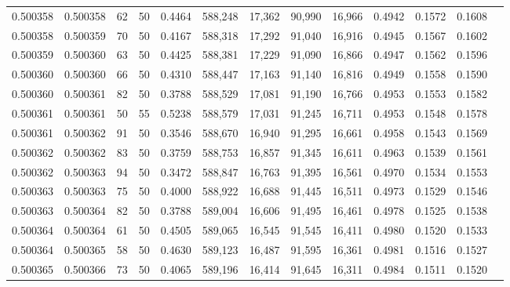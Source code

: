 \begin{tabular}{rrrrrrrrrrrrr}
0.500358 & 0.500358 &    62 &  50 &                                     0.4464 & 588,248 &  17,362 &  90,990 &  16,966 & 0.4942 & 0.1572 & 0.1608 \\
0.500358 & 0.500359 &    70 &  50 &                                     0.4167 & 588,318 &  17,292 &  91,040 &  16,916 & 0.4945 & 0.1567 & 0.1602 \\
0.500359 & 0.500360 &    63 &  50 &                                     0.4425 & 588,381 &  17,229 &  91,090 &  16,866 & 0.4947 & 0.1562 & 0.1596 \\
0.500360 & 0.500360 &    66 &  50 &                                     0.4310 & 588,447 &  17,163 &  91,140 &  16,816 & 0.4949 & 0.1558 & 0.1590 \\
0.500360 & 0.500361 &    82 &  50 &                                     0.3788 & 588,529 &  17,081 &  91,190 &  16,766 & 0.4953 & 0.1553 & 0.1582 \\
0.500361 & 0.500361 &    50 &  55 &                                     0.5238 & 588,579 &  17,031 &  91,245 &  16,711 & 0.4953 & 0.1548 & 0.1578 \\
0.500361 & 0.500362 &    91 &  50 &                                     0.3546 & 588,670 &  16,940 &  91,295 &  16,661 & 0.4958 & 0.1543 & 0.1569 \\
0.500362 & 0.500362 &    83 &  50 &                                     0.3759 & 588,753 &  16,857 &  91,345 &  16,611 & 0.4963 & 0.1539 & 0.1561 \\
0.500362 & 0.500363 &    94 &  50 &                                     0.3472 & 588,847 &  16,763 &  91,395 &  16,561 & 0.4970 & 0.1534 & 0.1553 \\
0.500363 & 0.500363 &    75 &  50 &                                     0.4000 & 588,922 &  16,688 &  91,445 &  16,511 & 0.4973 & 0.1529 & 0.1546 \\
0.500363 & 0.500364 &    82 &  50 &                                     0.3788 & 589,004 &  16,606 &  91,495 &  16,461 & 0.4978 & 0.1525 & 0.1538 \\
0.500364 & 0.500364 &    61 &  50 &                                     0.4505 & 589,065 &  16,545 &  91,545 &  16,411 & 0.4980 & 0.1520 & 0.1533 \\
0.500364 & 0.500365 &    58 &  50 &                                     0.4630 & 589,123 &  16,487 &  91,595 &  16,361 & 0.4981 & 0.1516 & 0.1527 \\
0.500365 & 0.500366 &    73 &  50 &                                     0.4065 & 589,196 &  16,414 &  91,645 &  16,311 & 0.4984 & 0.1511 & 0.1520 \\

\end{tabular}
